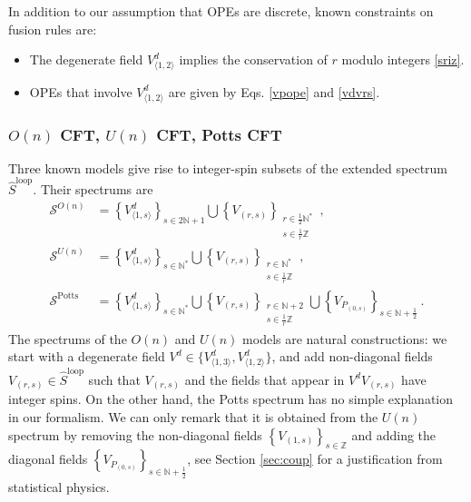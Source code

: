 \documentclass[12pt, a4paper]{article}
\theoremstyle{break}
\begin{document}
In addition to our assumption that OPEs are discrete, known constraints on fusion rules are:
\begin{itemize}
 \item The degenerate field $V^d_{\langle 1,2\rangle}$ implies the conservation of $r$ modulo integers \eqref{sriz}.
 \item OPEs that involve $V^d_{\langle 1,2\rangle}$ are given by Eqs. \eqref{vpope} and \eqref{vdvrs}.
\end{itemize}

\subsubsection{$O(n)$ CFT, $U(n)$ CFT, Potts CFT}\label{sec:models}

Three known models give rise to integer-spin subsets of the extended spectrum $\widehat{S}^\text{loop}$. 
Their spectrums are 
\begin{align}
\mathcal{S}^{O(n)} &= \left\{V^d_{\langle 1,s\rangle}\right\}_{s\in 2\mathbb{N}+1} \bigcup \left\{V_{(r,s)}\right\}_{\substack{r\in \frac12\mathbb{N}^*\\ s\in\frac{1}{r}\mathbb{Z}}}  \ ,
\label{son}
 \\
 \mathcal{S}^{U(n)} &= \left\{V^d_{\langle 1,s\rangle}\right\}_{s\in\mathbb{N}^*} \bigcup \left\{V_{(r,s)}\right\}_{\substack{r\in \mathbb{N}^*\\ s\in\frac{1}{r}\mathbb{Z}}}  \ ,
 \label{sun}
 \\
 \mathcal{S}^\text{Potts} &= \left\{V^d_{\langle 1,s\rangle}\right\}_{s\in\mathbb{N}^*} \bigcup \left\{V_{(r,s)}\right\}_{\substack{r\in \mathbb{N}+2\\ s\in\frac{1}{r}\mathbb{Z}}} \bigcup  \left\{ V_{P_{(0,s)}}\right\}_{s\in \mathbb{N}+\frac12}\ .
 \label{spotts}
\end{align}
The spectrums of the $O(n)$ and $U(n)$ models are natural constructions: we start with a degenerate field $V^d\in\{V^d_{\langle 1,3\rangle},V^d_{\langle 1,2\rangle}\}$, and add non-diagonal fields $V_{(r,s)}\in\widehat{S}^\text{loop}$ such that $V_{(r,s)}$ and the fields that appear in $V^dV_{(r,s)}$ have integer spins. 
On the other hand, the Potts spectrum has no simple explanation in our formalism. We can only remark that it is obtained from the $U(n)$ spectrum by removing the non-diagonal fields $\left\{V_{(1,s)}\right\}_{s\in\mathbb{Z}}$ and adding the diagonal fields $\left\{ V_{P_{(0,s)}}\right\}_{s\in \mathbb{N}+\frac12}$, see Section \ref{sec:coup} for a justification from statistical physics.  
\end{document}
